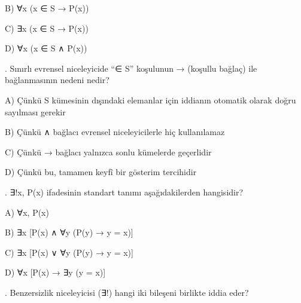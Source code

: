 \par\noindent\hspace*{1.6em}B) ∀x (x ∈ S → P(x))

\par\noindent\hspace*{1.6em}C) ∃x (x ∈ S → P(x))

\par\noindent\hspace*{1.6em}D) ∀x (x ∈ S ∧ P(x))

\par\smallskip{}. Sınırlı evrensel niceleyicide “∈ S” koşulunun → (koşullu bağlaç) ile bağlanmasının nedeni nedir?

\par\noindent\hspace*{1.6em}A) Çünkü S kümesinin dışındaki elemanlar için iddianın otomatik olarak doğru sayılması gerekir

\par\noindent\hspace*{1.6em}B) Çünkü ∧ bağlacı evrensel niceleyicilerle hiç kullanılamaz

\par\noindent\hspace*{1.6em}C) Çünkü → bağlacı yalnızca sonlu kümelerde geçerlidir

\par\noindent\hspace*{1.6em}D) Çünkü bu, tamamen keyfî bir gösterim tercihidir

\par\smallskip{}. ∃!x, P(x) ifadesinin standart tanımı aşağıdakilerden hangisidir?

\par\noindent\hspace*{1.6em}A) ∀x, P(x)

\par\noindent\hspace*{1.6em}B) ∃x [P(x) ∧ ∀y (P(y) → y = x)]

\par\noindent\hspace*{1.6em}C) ∃x [P(x) ∨ ∀y (P(y) → y = x)]

\par\noindent\hspace*{1.6em}D) ∀x [P(x) → ∃y (y = x)]

\par\smallskip{}. Benzersizlik niceleyicisi (∃!) hangi iki bileşeni birlikte iddia eder?

